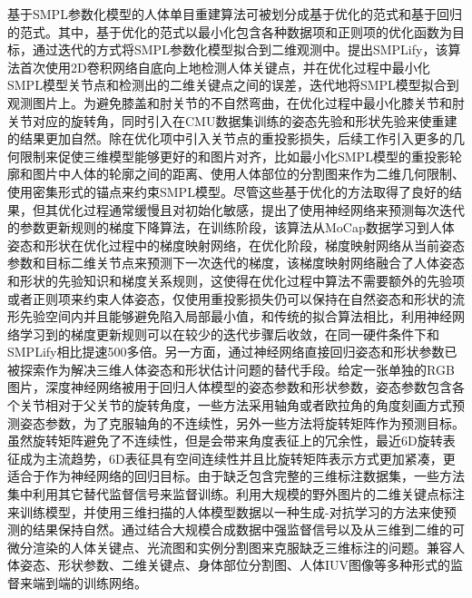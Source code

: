 基于SMPL参数化模型的人体单目重建算法可被划分成基于优化的范式和基于回归的范式。其中，基于优化的范式以最小化包含各种数据项和正则项的优化函数为目标，通过迭代的方式将SMPL参数化模型拟合到二维观测中。\citet{smplify}提出SMPLify，该算法首次使用2D卷积网络自底向上地检测人体关键点，并在优化过程中最小化SMPL模型关节点和检测出的二维关键点之间的误差，迭代地将SMPL模型拟合到观测图片上。为避免膝盖和肘关节的不自然弯曲，在优化过程中最小化膝关节和肘关节对应的旋转角，同时引入在CMU数据集训练的姿态先验和形状先验来使重建的结果更加自然。除在优化项中引入关节点的重投影损失，后续工作引入更多的几何限制来促使三维模型能够更好的和图片对齐，比如\citet{UP-3D}最小化SMPL模型的重投影轮廓和图片中人体的轮廓之间的距离、\citet{NBF:3DV:2018}使用人体部位的分割图来作为二维几何限制、\citet{Zanfir_2021_ICCV}使用密集形式的锚点来约束SMPL模型。尽管这些基于优化的方法取得了良好的结果，但其优化过程通常缓慢且对初始化敏感，\citet{Song2020HumanBM}提出了使用神经网络来预测每次迭代的参数更新规则的梯度下降算法，在训练阶段，该算法从MoCap数据学习到人体姿态和形状在优化过程中的梯度映射网络，在优化阶段，梯度映射网络从当前姿态参数和目标二维关节点来预测下一次迭代的梯度，该梯度映射网络融合了人体姿态和形状的先验知识和梯度关系规则，这使得在优化过程中算法不需要额外的先验项或者正则项来约束人体姿态，仅使用重投影损失仍可以保持在自然姿态和形状的流形先验空间内并且能够避免陷入局部最小值，和传统的拟合算法相比，利用神经网络学习到的梯度更新规则可以在较少的迭代步骤后收敛，在同一硬件条件下和SMPLify相比提速500多倍。另一方面，通过神经网络直接回归姿态和形状参数已被探索作为解决三维人体姿态和形状估计问题的替代手段。给定一张单独的RGB图片，深度神经网络被用于回归人体模型的姿态参数和形状参数，姿态参数包含各个关节相对于父关节的旋转角度，一些方法\citep{kanazawaHMR18, Pavlakos_2018_CVPR, Guler_2019_CVPR}采用轴角或者欧拉角的角度刻画方式预测姿态参数，为了克服轴角的不连续性，另外一些方法\citep{Omran2018NeuralBF, Zhang2019DaNetDN}将旋转矩阵作为预测目标。虽然旋转矩阵避免了不连续性，但是会带来角度表征上的冗余性，最近6D旋转表征\citep{Zhou_2019_CVPR}成为主流趋势\citep{Zhou_2021_CVPR, Choi_2021_CVPR}，6D表征具有空间连续性并且比旋转矩阵表示方式更加紧凑，更适合于作为神经网络的回归目标。由于缺乏包含完整的三维标注数据集，一些方法集中利用其它替代监督信号来监督训练。\citet{kanazawaHMR18}利用大规模的野外图片的二维关键点标注来训练模型，并使用三维扫描的人体模型数据以一种生成-对抗学习的方法来使预测的结果保持自然。\citet{NIPS2017_ab452534}通过结合大规模合成数据中强监督信号以及从三维到二维的可微分渲染的人体关键点、光流图和实例分割图来克服缺乏三维标注的问题。\citet{Xu_2019_ICCV}兼容人体姿态、形状参数、二维关键点、身体部位分割图、人体IUV图像等多种形式的监督来端到端的训练网络。

